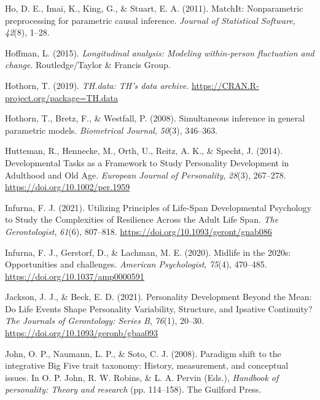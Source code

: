 \documentclass[
  english,
  man,floatsintext]{apa7}
\begin{document}
\leavevmode\hypertarget{ref-MatchIt2011}{}%
Ho, D. E., Imai, K., King, G., \& Stuart, E. A. (2011). MatchIt: Nonparametric preprocessing for parametric causal inference. \emph{Journal of Statistical Software}, \emph{42}(8), 1--28.

\leavevmode\hypertarget{ref-hoffmanLongitudinalAnalysisModeling2015}{}%
Hoffman, L. (2015). \emph{Longitudinal analysis: Modeling within-person fluctuation and change}. Routledge/Taylor \& Francis Group.

\leavevmode\hypertarget{ref-R-TH.data}{}%
Hothorn, T. (2019). \emph{TH.data: TH's data archive}. \url{https://CRAN.R-project.org/package=TH.data}

\leavevmode\hypertarget{ref-R-multcomp}{}%
Hothorn, T., Bretz, F., \& Westfall, P. (2008). Simultaneous inference in general parametric models. \emph{Biometrical Journal}, \emph{50}(3), 346--363.

\leavevmode\hypertarget{ref-huttemanDevelopmentalTasksFramework2014}{}%
Hutteman, R., Hennecke, M., Orth, U., Reitz, A. K., \& Specht, J. (2014). Developmental Tasks as a Framework to Study Personality Development in Adulthood and Old Age. \emph{European Journal of Personality}, \emph{28}(3), 267--278. \url{https://doi.org/10.1002/per.1959}

\leavevmode\hypertarget{ref-infurnaUtilizingPrinciplesLifeSpan2021}{}%
Infurna, F. J. (2021). Utilizing Principles of Life-Span Developmental Psychology to Study the Complexities of Resilience Across the Adult Life Span. \emph{The Gerontologist}, \emph{61}(6), 807--818. \url{https://doi.org/10.1093/geront/gnab086}

\leavevmode\hypertarget{ref-infurnaMidlife2020sOpportunities2020}{}%
Infurna, F. J., Gerstorf, D., \& Lachman, M. E. (2020). Midlife in the 2020s: Opportunities and challenges. \emph{American Psychologist}, \emph{75}(4), 470--485. \url{https://doi.org/10.1037/amp0000591}

\leavevmode\hypertarget{ref-jacksonPersonalityDevelopmentMean2021}{}%
Jackson, J. J., \& Beck, E. D. (2021). Personality Development Beyond the Mean: Do Life Events Shape Personality Variability, Structure, and Ipsative Continuity? \emph{The Journals of Gerontology: Series B}, \emph{76}(1), 20--30. \url{https://doi.org/10.1093/geronb/gbaa093}

\leavevmode\hypertarget{ref-johnParadigmShiftIntegrative2008}{}%
John, O. P., Naumann, L. P., \& Soto, C. J. (2008). Paradigm shift to the integrative Big Five trait taxonomy: History, measurement, and conceptual issues. In O. P. John, R. W. Robins, \& L. A. Pervin (Eds.), \emph{Handbook of personality: Theory and research} (pp. 114--158). The Guilford Press.
\end{document}
